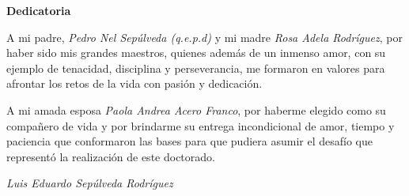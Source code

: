 \newpage
\thispagestyle{empty}

\vspace{1cm}
{\huge \textbf{Dedicatoria}}\\
\vspace{1.5cm}

\begin{flushright}

    A mi padre, \textit{Pedro Nel Sepúlveda (q.e.p.d)} y mi madre \textit{Rosa Adela Rodríguez}, por haber sido mis grandes maestros, quienes además de un inmenso amor, con su ejemplo de tenacidad, disciplina y perseverancia, me formaron en valores para afrontar los retos de la vida con pasión y dedicación.

        \vspace{0.3cm}

    A mi amada esposa \textit{Paola Andrea Acero Franco}, por haberme elegido como su compañero de vida y por brindarme su entrega incondicional de amor, tiempo y paciencia que conformaron las bases para que pudiera asumir el desafío que representó la realización de este doctorado.

\end{flushright}
\vspace{1.0cm}
\begin{flushright}
    \textit{Luis Eduardo Sepúlveda Rodríguez}
\end{flushright}
